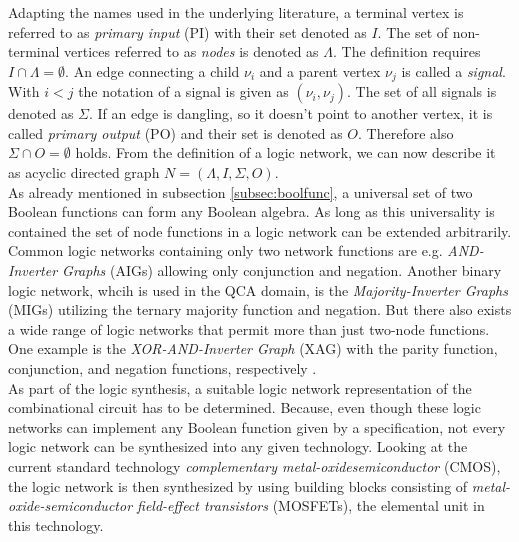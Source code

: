 Adapting the names used in the underlying literature, a terminal vertex is referred to as \textit{primary input} (PI) with their set denoted as $I$. The set of non-terminal vertices referred to as \textit{nodes} is denoted as $\Lambda$. The definition requires $I \cap \Lambda = \emptyset$. An edge connecting a child $\nu_i$ and a parent vertex $\nu_j$ is called a \textit{signal}. With $i < j$ the notation of a signal is given as $(\nu_i, \nu_j)$. The set of all signals is denoted as $\Sigma$. If an edge is dangling, so it doesn't point to another vertex, it is called \textit{primary output} (PO) and their set is denoted as $O$. Therefore also $\Sigma \cap O = \emptyset$ holds. From the definition of a logic network, we can now describe it as acyclic directed graph $N = (\Lambda, I, \Sigma, O)$.\\
As already mentioned in subsection \ref{subsec:boolfunc}, a universal set of two Boolean functions can form any Boolean algebra.
As long as this universality is contained the set of node functions in a logic network can be extended arbitrarily. Common logic networks containing only two network functions are e.g. \textit{AND-Inverter Graphs} (AIGs) allowing only conjunction and negation. Another binary logic network, whcih is used in the QCA domain, is the \textit{Majority-Inverter Graphs} (MIGs) utilizing the ternary majority function and negation. But there also exists a wide range of logic networks that permit more than just two-node functions. One example is the \textit{XOR-AND-Inverter Graph} (XAG) with the parity function, conjunction, and negation functions, respectively \cite{Walter}.\\
As part of the logic synthesis, a suitable logic network representation of the combinational circuit has to be determined. Because, even though these logic networks can implement any Boolean function given by a specification, not every logic network can be synthesized into any given technology.
Looking at the current standard technology \textit{complementary metal-oxidesemiconductor} (CMOS), the logic network is then synthesized by using building blocks consisting of \textit{metal-oxide-semiconductor field-effect transistors} (MOSFETs), the elemental unit in this technology.\\

